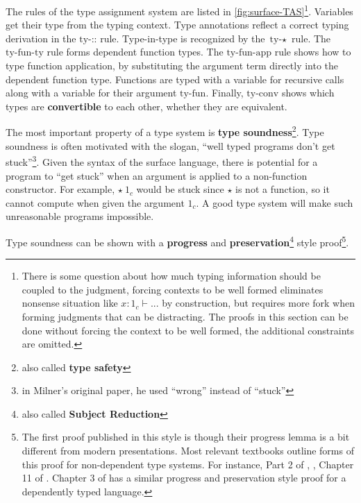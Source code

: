 The rules of the type assignment system are listed in \ref{fig:surface-TAS}\footnote{There is some question about how much typing information should be coupled to the judgment, forcing contexts to be well formed eliminates nonsense situation like $x:1_{c}\vdash...$ by construction, but requires more fork when forming judgments that can be distracting.
The proofs in this section can be done without forcing the context to be well formed, the additional constraints are omitted.}.
Variables get their type from the typing context.
Type annotations reflect a correct typing derivation in the $\textrm{ty-::}$ rule.
Type-in-type is recognized by the $\textrm{ty-}\star$ rule.
The $\textrm{ty-fun-ty}$ rule forms dependent function types.
The $\textrm{ty-fun-app}$ rule shows how to type function application, by substituting the argument term directly into the dependent function type.
Functions are typed with a variable for recursive calls along with a variable for their argument $\textrm{ty-fun}$.
Finally, $\textrm{ty-conv}$ shows which types are \textbf{convertible} to each other, whether they are equivalent.

The most important property of a type system is \textbf{type soundness}\footnote{also called \textbf{type safety}}.
Type soundness is often motivated with the slogan, ``well typed programs don't get stuck''\cite{MILNER1978348}\footnote{in Milner's original paper, he used ``wrong'' instead of ``stuck''}.
Given the syntax of the surface language, there is potential for a program to ``get stuck'' when an argument is applied to a non-function constructor.
For example, $\star\ 1_{c}$ would be stuck since $\star$ is not a function, so it cannot compute when given the argument $1_{c}$.
A good type system will make such unreasonable programs impossible.

Type soundness can be shown with a \textbf{progress} and \textbf{preservation}\footnote{also called  \textbf{Subject Reduction}} style proof\cite{WRIGHT199438}\footnote{The first proof published in this style is \cite{WRIGHT199438} though their progress lemma is a bit different from modern presentations.
Most relevant textbooks outline forms of this proof for non-dependent type systems.
For instance, Part 2 of \cite{pierce2002types}, \cite{KOKKE2020102440}, Chapter 11 of \cite{chlipala2017formal}.
Chapter 3 of \cite{sjoberg2015dependently} has a similar progress and preservation style proof for a dependently typed language.}.

